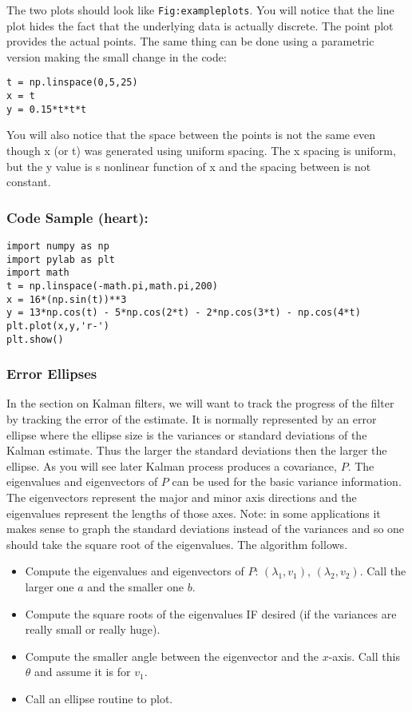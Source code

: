 The two plots should look like \texttt{Fig:exampleplots}. You will
notice that the line plot hides the fact that the underlying data is
actually discrete. The point plot provides the actual points. The same
thing can be done using a parametric version making the small change in
the code:

\begin{verbatim}
t = np.linspace(0,5,25)
x = t
y = 0.15*t*t*t
\end{verbatim}

You will also notice that the space between the points is not the same
even though x (or t) was generated using uniform spacing. The x spacing
is uniform, but the y value is s nonlinear function of x and the spacing
between is not constant.

\hypertarget{code-sample-heart}{%
\subsubsection{Code Sample (heart):}\label{code-sample-heart}}

\begin{verbatim}
import numpy as np
import pylab as plt
import math
t = np.linspace(-math.pi,math.pi,200)
x = 16*(np.sin(t))**3
y = 13*np.cos(t) - 5*np.cos(2*t) - 2*np.cos(3*t) - np.cos(4*t)
plt.plot(x,y,'r-')
plt.show()
\end{verbatim}

\hypertarget{cubicsplineexample}{%
\subsubsection{Error Ellipses}\label{cubicsplineexample}}

In the section on Kalman filters, we will want to track the progress of
the filter by tracking the error of the estimate. It is normally
represented by an error ellipse where the ellipse size is the variances
or standard deviations of the Kalman estimate. Thus the larger the
standard deviations then the larger the ellipse. As you will see later
Kalman process produces a covariance, \(P\). The eigenvalues and
eigenvectors of \(P\) can be used for the basic variance information.
The eigenvectors represent the major and minor axis directions and the
eigenvalues represent the lengths of those axes. Note: in some
applications it makes sense to graph the standard deviations instead of
the variances and so one should take the square root of the eigenvalues.
The algorithm follows.

\begin{itemize}
\tightlist
\item
  Compute the eigenvalues and eigenvectors of \(P\):
  \((\lambda_1, v_1)\), \((\lambda_2, v_2)\). Call the larger one \(a\)
  and the smaller one \(b\).
\item
  Compute the square roots of the eigenvalues IF desired (if the
  variances are really small or really huge).
\item
  Compute the smaller angle between the eigenvector and the \(x\)-axis.
  Call this \(\theta\) and assume it is for \(v_1\).
\item
  Call an ellipse routine to plot.
\end{itemize}

